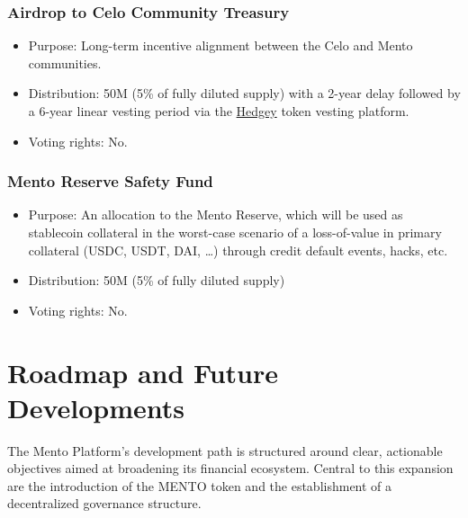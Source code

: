 \documentclass[a4paper]{article}
\theoremstyle{definition}
\begin{document}
\subsubsection*{Airdrop to Celo Community Treasury}
\begin{itemize}
    \item Purpose: Long-term incentive alignment between the Celo and Mento communities.
    \item Distribution: 50M (5\% of fully diluted supply) with a 2-year delay followed by a 6-year linear vesting period via the \href{https://hedgey.finance/}{Hedgey} token vesting platform.
    \item Voting rights: No.
\end{itemize}

\subsubsection*{Mento Reserve Safety Fund}
\begin{itemize}
    \item Purpose: An allocation to the Mento Reserve, which will be used as stablecoin collateral in the worst-case scenario of a loss-of-value in primary collateral (USDC, USDT, DAI, …) through credit default events, hacks, etc. 
    \item Distribution: 50M (5\% of fully diluted supply)
    \item Voting rights: No.
\end{itemize}

\section{Roadmap and Future Developments}
\label{sec:roadmap}

The Mento Platform's development path is structured around clear, actionable objectives aimed at broadening its financial ecosystem. Central to this expansion are the introduction of the MENTO token and the establishment of a decentralized governance structure.
\end{document}
